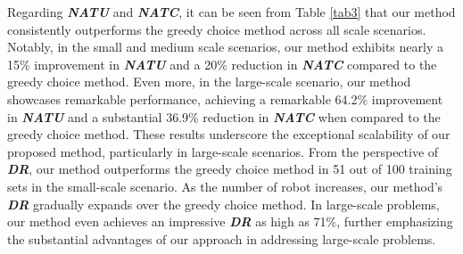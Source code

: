 \documentclass[lettersize,journal]{IEEEtran}
\newcommand{\blue}[1]{\textcolor{blue}{#1}}
\begin{document}
\begin{table}[t]
\centering
\caption{\centering\scshape{\blue{Comparison between LIA\_MADDPG and the greedy choice method in different scale scenarios}}}
\label{tab3}
\end{table}


Regarding \textit{\textbf{NATU}} and \textit{\textbf{NATC}},  it can be seen from Table \ref{tab3} that our method consistently outperforms the greedy choice method across all scale scenarios. Notably, in the small and medium scale scenarios, our method exhibits nearly a 15\% improvement in \textit{\textbf{NATU}} and a 20\% reduction in \textit{\textbf{NATC}} compared to the greedy choice method.  Even more, in the large-scale scenario, our method showcases remarkable performance, achieving a remarkable 64.2\% improvement in \textit{\textbf{NATU}} and a substantial 36.9\% reduction in \textit{\textbf{NATC}} when compared to the greedy choice method. These results underscore the exceptional scalability of our proposed method, particularly in large-scale scenarios. From the perspective of \textit{\textbf{DR}}, our method outperforms the greedy choice method in 51 out of 100 training sets in the small-scale scenario. As the number of robot increases, our method's \textit{\textbf{DR}} gradually expands over the greedy choice method.  In large-scale problems, our method even achieves an impressive \textbf{\textit{DR}} as high as 71\%, further emphasizing the substantial advantages of our approach in addressing large-scale problems.
\end{document}
